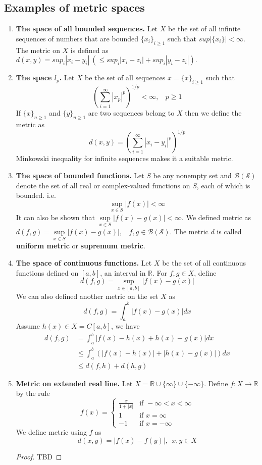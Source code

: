 \documentclass[12pt]{report}
\begin{document}
\subsection*{Examples of metric spaces}
\begin{enumerate}
    \item \textbf{The space of all bounded sequences.} Let $X$ be the set of all infinite sequences of numbers that are bounded $\{x_i\}_{i \geq 1}$ such that $sup|\{x_i\}| < \infty$. The metric on $X$ is defined as $d(x,y)= sup_i|x_i - y_i| ~(\leq sup_i|x_i - z_i| + sup_i|y_i - z_i|).$
    \item \textbf{The space $l_p$.} Let $X$ be the set of all sequences $x = \{x\}_{i \geq 1}$ such that 
    $$ \left(\sum\limits_{i = 1}^{\infty} |x_p|^p\right)^{1/p} < \infty,~~~~p \geq 1$$
    If $\{x\}_{n \geq 1}$ and $\{y\}_{n \geq 1}$ are two sequences belong to $X$ then we define the metric as
    $$ d(x,y) = \left(\sum\limits_{i = 1}^{\infty} |x_i - y_i|^p\right)^{1/p}$$
    Minkowski inequality for infinite sequences makes it a suitable metric.
    \item \textbf{The space of bounded functions.} Let $S$ be any nonempty set and $\mathcal{B(S)}$ denote the set of all real or complex-valued functions on $S$, each of which is bounded. i.e. 
    $$ \sup\limits_{x \in S} |f(x)| < \infty$$
    It can also be shown that $\sup\limits_{x \in S} |f(x) - g(x)| < \infty$. We defined metric as $d(f,g) = \sup\limits_{x \in S}|f(x) - g(x)|,~~~~ f,g \in \mathcal{B(S)}$. The metric $d$ is called \textbf{uniform metric} or \textbf{supremum metric}.
    \item \textbf{The space of continuous functions.} Let $X$ be the set of all continuous functions defined on $[a,b]$, an interval in $\mathbb{R}$. For $f,g \in X$, define
    $$ d(f,g) = \sup\limits_{x\in [a,b]} |f(x) - g(x)|$$
    We can also defined another metric on the set $X$ as
    $$ d(f,g) = \int_a^b |f(x) - g(x)| dx$$
    Assume $h(x) \in X = C[a,b]$, we have
    \begin{align*}
        d(f,g) &= \int_a^b |f(x) - h(x) + h(x) - g(x)| dx\\
        &\leq \int_a^b \left(|f(x) - h(x)| + |h(x) - g(x)| \right)dx\\
        &\leq d(f,h) + d(h,g)
    \end{align*}
    \item \textbf{Metric on extended real line.} Let $X = \mathbb{R} \cup \{\infty\} \cup \{-\infty\}$. Define $f: X \to \mathbb{R}$ by the rule
    $$ f(x) = \begin{cases}
        \frac{x}{1+|x|} & \text{if } -\infty < x < \infty \\
        1 & \text{if } x = \infty\\
        -1 & \text{if } x = -\infty
    \end{cases}
    $$
    We define metric using $f$ as 
    $$ d(x,y) = |f(x) - f(y)|, ~~ x,y \in X$$
    \begin{proof}
        TBD
    \end{proof}
    
\end{enumerate}
\end{document}
